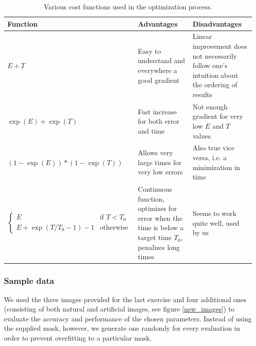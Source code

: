 \documentclass[10pt,conference,compsocconf]{IEEEtran}
\begin{document}
\begin{table}
\centering
{\renewcommand{\arraystretch}{1.5}
\renewcommand{\tabcolsep}{0.2cm}
\begin{tabular}{|l|p{6cm}|p{6cm}|}
\hline
Function & Advantages & Disadvantages \\
\hline
$E + T$ & Easy to understand and everywhere a good gradient & Linear improvement does not necessarily follow one's intuition about the ordering of results \\
\hline
$\exp(E)+\exp(T)$ & Fast increase for both error and time & Not enough gradient for very low $E$ and $T$ values \\
\hline
$(1-\exp(E))*(1-\exp(T))$ & Allows very large times for very low errors & Also true vice versa, i.e. a minimization in time \\
\hline
$ \begin{cases}
E & \text{if }T<T_0\\
E+\exp(T/T_0 - 1) - 1 & \text{otherwise}
\end{cases} $ & Continuous function, optimizes for error when the time is below a target time $T_0$, penalizes long times & Seems to work quite well, used by us \\
\hline
\end{tabular}}
\caption{Various cost functions used in the optimization process.}
\label{cost_functions}
\end{table}

\subsubsection{Sample data}
We used the three images provided for the last exercise and four additional ones (consisting of both natural and artificial images, see figure \ref{new_images}) to evaluate the accuracy and performance of the chosen parameters. Instead of using the supplied mask, however, we generate one randomly for every evaluation in order to prevent overfitting to a particular mask.
\end{document}
